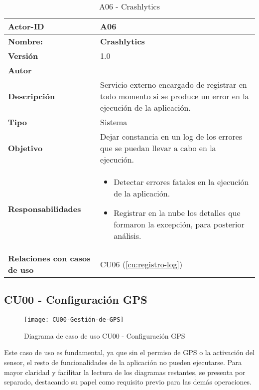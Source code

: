 \begin{table}[H]
	\centering

	\begin{tabularx}{\linewidth}{ p{} p{} }
		\toprule
		\textbf{Actor-ID}    & A06 \\
		\toprule
		\textbf{Nombre: }			  & \textbf{Crashlytics} \\
		\textbf{Versión}              & 1.0    \\
		\textbf{Autor}                & \autor \\
		\textbf{Descripción}          & Servicio externo encargado de registrar en todo momento si se produce un error en la ejecución de la aplicación. \\
		\textbf{Tipo}                 & Sistema \\
		\textbf{Objetivo}             & Dejar constancia en un log de los errores que se puedan llevar a cabo en la ejecución. \\
		\textbf{Responsabilidades}    & 
		\begin{itemize}
			\tightlist
			\item Detectar errores fatales en la ejecución de la aplicación.
			\item Registrar en la nube los detalles que formaron la excepción, para posterior análisis.
		\end{itemize}\\
		\textbf{Relaciones con casos de uso} & CU06 (\ref{cu:registro-log}) \\
		\bottomrule
	\end{tabularx}
	\caption{A06 - Crashlytics}
		\label{actor:crashlytics}
\end{table}

\subsection{CU00 - Configuración GPS}
\begin{figure}[H]
	\centering
	\texttt{[image: CU00-Gestión-de-GPS]}
	\caption{Diagrama de caso de uso CU00 - Configuración GPS}
	\label{fig:CU00-Gestión-de-GPS}
\end{figure}

Este caso de uso es fundamental, ya que sin el permiso de GPS o la activación del sensor, el resto de funcionalidades de la aplicación no pueden ejecutarse. Para mayor claridad y facilitar la lectura de los diagramas restantes, se presenta por separado, destacando su papel como requisito previo para las demás operaciones.

